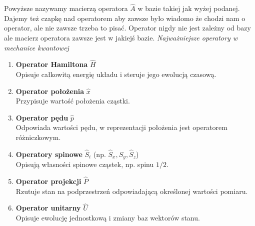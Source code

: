 \begin{itemize}
\begin{itemize}
Powyższe nazywamy macierzą operatora $\hat{A}$ w bazie takiej jak wyżej podanej. Dajemy też czapkę nad operatorem aby zawsze było wiadomo że chodzi nam o operator, ale nie zawsze trzeba to pisać. Operator nigdy nie jest zależny od bazy ale macierz operatora zawsze jest w jakiejś bazie.
\textit{Najważniejsze operatory w mechanice kwantowej}

\begin{enumerate}
  \item \textbf{Operator Hamiltona} \(\hat{H}\) \\
    Opisuje całkowitą energię układu i steruje jego ewolucją czasową.

  \item \textbf{Operator położenia} \(\hat{x}\) \\
    Przypisuje wartość położenia cząstki.

  \item \textbf{Operator pędu} \(\hat{p}\) \\
    Odpowiada wartości pędu, w reprezentacji położenia jest operatorem różniczkowym.

  \item \textbf{Operatory spinowe} \(\hat{S}_i\) (np. \(\hat{S}_x, \hat{S}_y, \hat{S}_z\)) \\
    Opisują własności spinowe cząstek, np. spinu \(1/2\).

  \item \textbf{Operator projekcji} \(\hat{P}\) \\
    Rzutuje stan na podprzestrzeń odpowiadającą określonej wartości pomiaru.

  \item \textbf{Operator unitarny} \(\hat{U}\) \\
    Opisuje ewolucję jednostkową i zmiany baz wektorów stanu.


\end{enumerate}
\end{itemize}
\end{itemize}
